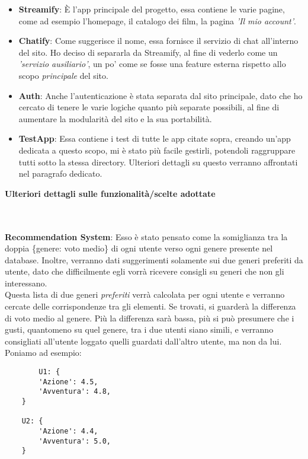 \documentclass[12pt]{article}
\begin{document}
	\begin{itemize}
		\item \textbf{Streamify}: È l'app principale del progetto, essa contiene le varie pagine, come ad esempio l'homepage, il catalogo dei film, la pagina \textit{'Il mio account'}. 
		
		\item \textbf{Chatify}: Come suggerisce il nome, essa fornisce il servizio di chat all'interno del sito. Ho deciso di separarla da Streamify, al fine di vederlo come un \textit{'servizio ausiliario'}, un po' come se fosse una feature esterna rispetto allo scopo \textit{principale} del sito.
		
		\item \textbf{Auth}: Anche l'autenticazione è stata separata dal sito principale, dato che ho cercato di tenere le varie logiche quanto più separate possibili, al fine di aumentare la modularità del sito e la sua portabilità.
		
		\item \textbf{TestApp}: Essa contiene i test di tutte le app citate sopra, creando un'app dedicata a questo scopo, mi è stato più facile gestirli, potendoli raggruppare tutti sotto la stessa directory. Ulteriori dettagli su questo verranno affrontati nel paragrafo dedicato.
	\end{itemize}
	\pagebreak
	
	
	\noindent \centerline {\Huge \textbf{Ulteriori dettagli sulle funzionalità/scelte adottate}} \\ \\
	
	\noindent \textbf{Recommendation System}: Esso è stato pensato come la somiglianza tra la doppia \{genere: voto medio\} di ogni utente verso ogni genere presente nel database.
	Inoltre, verranno dati suggerimenti solamente sui due generi preferiti da utente, dato che difficilmente egli vorrà ricevere consigli su generi che non gli interessano. \\Questa lista di due generi \textit{preferiti} verrà calcolata per ogni utente e verranno cercate delle corrispondenze tra gli elementi. Se trovati, si guarderà la differenza di voto medio al genere. Più la differenza sarà bassa, più si può presumere che i gusti, quantomeno su quel genere, tra i due utenti siano simili, e verranno consigliati all'utente loggato quelli guardati dall'altro utente, ma non da lui. \\
	Poniamo ad esempio:
	\begin{verbatim}
		U1: {
		'Azione': 4.5,
		'Avventura': 4.8,
	}

	U2: {
		'Azione': 4.4,
		'Avventura': 5.0,
	}
	\end{verbatim}
\end{document}
